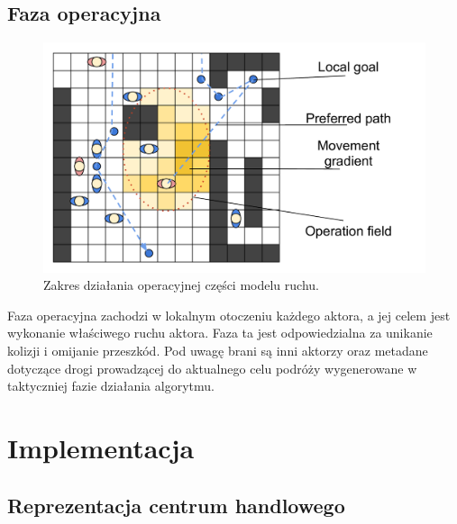 \documentclass[a4paper, 12pt]{article}
\begin{document}
        \subsection{Faza operacyjna}
        \label{sec:operational}

        \begin{figure}[h!]
            \centering
            \includegraphics[scale=0.3]{./img/Operative.pdf}
            \caption{Zakres działania operacyjnej części modelu ruchu.}
            \label{fig:operational}
        \end{figure}


        \noindent
        Faza operacyjna zachodzi w lokalnym otoczeniu każdego aktora, a jej celem jest wykonanie właściwego ruchu aktora. Faza ta jest odpowiedzialna za unikanie kolizji i omijanie przeszkód. Pod uwagę brani są inni aktorzy oraz metadane dotyczące drogi prowadzącej do aktualnego celu podróży wygenerowane w taktyczniej fazie działania algorytmu.

\newpage
    \section{Implementacja}
    \label{sec:implementation}

        \subsection{Reprezentacja centrum handlowego}
        \label{sec:mall-impl}
\end{document}
